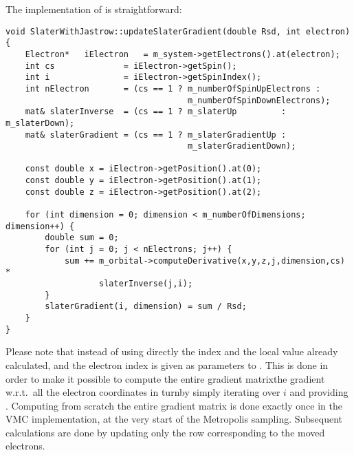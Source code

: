 \documentclass[../../master.tex]{subfiles}
\begin{document}
The implementation of  is straightforward:
\begin{lstlisting}[language={[std]c++}]
void SlaterWithJastrow::updateSlaterGradient(double Rsd, int electron) {
    Electron*   iElectron   = m_system->getElectrons().at(electron);
    int cs              = iElectron->getSpin();
    int i               = iElectron->getSpinIndex();
    int nElectron       = (cs == 1 ? m_numberOfSpinUpElectrons :
                                     m_numberOfSpinDownElectrons);
    mat& slaterInverse  = (cs == 1 ? m_slaterUp         : m_slaterDown);
    mat& slaterGradient = (cs == 1 ? m_slaterGradientUp :
                                     m_slaterGradientDown);

    const double x = iElectron->getPosition().at(0);
    const double y = iElectron->getPosition().at(1);
    const double z = iElectron->getPosition().at(2);

    for (int dimension = 0; dimension < m_numberOfDimensions; dimension++) {
        double sum = 0;
        for (int j = 0; j < nElectrons; j++) {
            sum += m_orbital->computeDerivative(x,y,z,j,dimension,cs) *
                   slaterInverse(j,i);
        }
        slaterGradient(i, dimension) = sum / Rsd;
    }
}
\end{lstlisting}
Please note that instead of using directly the  index and the local  value already calculated,  and the electron index is given as parameters to . This is done in order to make it possible to compute the entire gradient matrix\textemdash the gradient w.r.t.\ all the electron coordinates in turn\textemdash by simply iterating over $i$ and providing . Computing from scratch the entire gradient matrix is done exactly once in the VMC implementation, at the very start of the Metropolis sampling. Subsequent calculations are done by updating only the row corresponding to the moved electrons.
\end{document}
